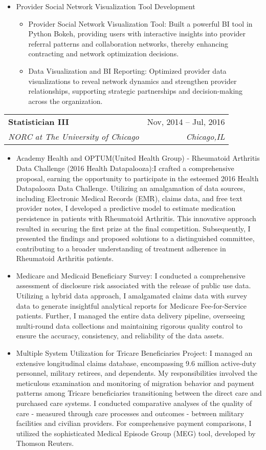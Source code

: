 \documentclass[letterpaper,11pt]{article}
\makeatletter
\newcommand{\resumeItem}[1]{
  \item{
    {#1 \vspace{-4pt}}
  }
}
\newcommand{\resumeSubheading}[4]{
  \vspace{-2pt}\item
    \begin{tabular*}{0.97\textwidth}[t]{l@{\extracolsep{\fill}}r}
      \textbf{#1} & #2 \\
      \textit{\small #3} & \textit{\small #4} \\
    \end{tabular*}\vspace{-10pt}
}
\newcommand{\resumeItemListStart}{\begin{itemize}}
\newcommand{\resumeItemListEnd}{\end{itemize}\vspace{-2pt}}
\makeatother
\begin{document}
    \resumeItemListStart
    \resumeItem{Provider Social Network Visualization Tool Development}
    \resumeItemListStart
        \resumeItem{Provider Social Network Visualization Tool: Built a powerful BI tool in Python Bokeh, providing users with interactive insights into provider referral patterns and collaboration networks, thereby enhancing contracting and network optimization decisions.}
        \resumeItem{Data Visualization and BI Reporting: Optimized provider data visualizations to reveal network dynamics and strengthen provider relationships, supporting strategic partnerships and decision-making across the organization.}
        \resumeItemListEnd
    \resumeItemListEnd
        
    \resumeSubheading
      {Statistician III}{Nov, 2014 -- Jul, 2016}
      {NORC at The University of Chicago}{Chicago,IL}
      \resumeItemListStart
        \small\resumeItem{Academy Health and OPTUM(United Health Group) - Rheumatoid Arthritis Data Challenge (2016 Health Datapalooza):I crafted a comprehensive proposal, earning the opportunity to participate in the esteemed 2016 Health Datapalooza Data Challenge. Utilizing an amalgamation of data sources, including Electronic Medical Records (EMR), claims data, and free text provider notes, I developed a predictive model to estimate medication persistence in patients with Rheumatoid Arthritis. This innovative approach resulted in securing the first prize at the final competition. Subsequently, I presented the findings and proposed solutions to a distinguished committee, contributing to a broader understanding of treatment adherence in Rheumatoid Arthritis patients.}
        \resumeItem{Medicare and Medicaid Beneficiary Survey: I conducted a comprehensive assessment of disclosure risk associated with the release of public use data. Utilizing a hybrid data approach, I amalgamated claims data with survey data to generate insightful analytical reports for Medicare Fee-for-Service patients. Further, I managed the entire data delivery pipeline, overseeing multi-round data collections and maintaining rigorous quality control to ensure the accuracy, consistency, and reliability of the data assets.}
        \resumeItem{Multiple System Utilization for Tricare Beneficiaries Project: I managed an extensive longitudinal claims database, encompassing 9.6 million active-duty personnel, military retirees, and dependents. My responsibilities involved the meticulous examination and monitoring of migration behavior and payment patterns among Tricare beneficiaries transitioning between the direct care and purchased care systems. I conducted comparative analyses of the quality of care - measured through care processes and outcomes - between military facilities and civilian providers. For comprehensive payment comparisons, I utilized the sophisticated Medical Episode Group (MEG) tool, developed by Thomson Reuters.}
        \resumeItemListEnd
        
\end{document}
